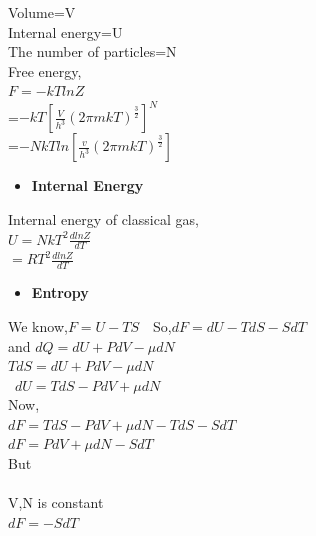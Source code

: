 \documentclass{article}
\newcommand*{\1}{\hspace{1pt}}
\begin{document}
Volume=V\\

Internal energy=U\\

The number of particles=N\\

Free energy,\\


 $ F=-kTlnZ$ \\
 
     =$-kT[{\frac{V}{h^3}}(2\pi  mkT)^{\frac{3}{2}}]^N$ \\
     
     =$-NkTln[\frac{v}{h^3}(2\pi mkT)^{\frac{3}{2}}]$\\
     
     
 


\begin{itemize}
    \item \textbf{Internal Energy}
\end{itemize}

Internal energy of classical gas,\\


   $U=NkT^2\frac{dlnZ}{dT}$\\

   $=RT^2\frac{dlnZ}{dT}$\\
   
   
\begin{itemize}
    \item\textbf{Entropy} \cite{l8} 
\end{itemize}
We know,$F=U-TS$\
\
So,$dF=dU-TdS-SdT$\\

and $dQ=dU+PdV-\mu dN$\\

    $TdS=dU+PdV-\mu dN$\\
    
\ $dU=TdS-PdV+\mu dN$\\

Now,\\
$dF=TdS-PdV+\mu dN-TdS-SdT$\\

$dF=PdV+\mu dN-SdT$\\

But\\
\\
V,N is constant\\

$dF=-SdT$\\
\end{document}
